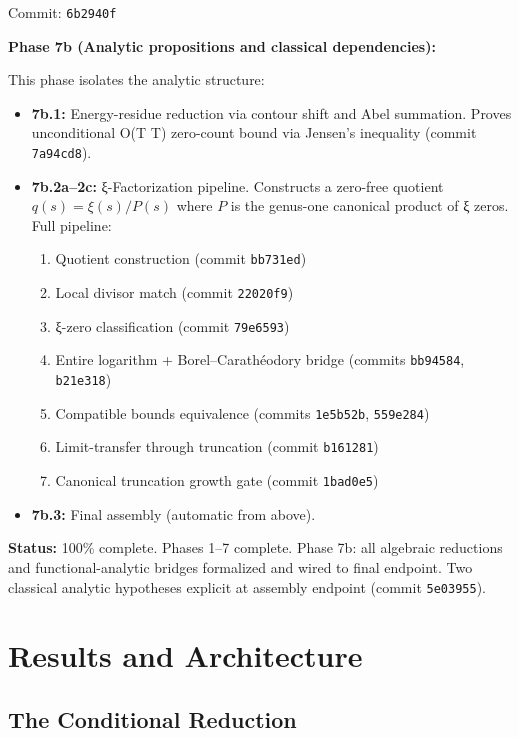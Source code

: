 \documentclass[11pt,a4paper]{article}
\newcommand{\commit}[1]{{\small\texttt{#1}}}
\begin{document}
Commit: \commit{6b2940f}

\textbf{Phase 7b (Analytic propositions and classical dependencies):}

This phase isolates the analytic structure:

\begin{itemize}
  \item \textbf{7b.1:} Energy-residue reduction via contour shift and Abel summation. Proves unconditional O(T \log T) zero-count bound via Jensen's inequality (commit \commit{7a94cd8}).

  \item \textbf{7b.2a--2c:} ξ-Factorization pipeline. Constructs a zero-free quotient $q(s) = \xi(s) / P(s)$ where $P$ is the genus-one canonical product of ξ zeros. Full pipeline:
    \begin{enumerate}
      \item Quotient construction (commit \commit{bb731ed})
      \item Local divisor match (commit \commit{22020f9})
      \item ξ-zero classification (commit \commit{79e6593})
      \item Entire logarithm + Borel--Carathéodory bridge (commits \commit{bb94584}, \commit{b21e318})
      \item Compatible bounds equivalence (commits \commit{1e5b52b}, \commit{559e284})
      \item Limit-transfer through truncation (commit \commit{b161281})
      \item Canonical truncation growth gate (commit \commit{1bad0e5})
    \end{enumerate}

  \item \textbf{7b.3:} Final assembly (automatic from above).
\end{itemize}

\textbf{Status:} 100\% complete. Phases 1--7 complete. Phase 7b: all algebraic reductions and functional-analytic bridges formalized and wired to final endpoint. Two classical analytic hypotheses explicit at assembly endpoint (commit \commit{5e03955}).

\section{Results and Architecture}
\label{sec:results}

\subsection{The Conditional Reduction}
\end{document}
